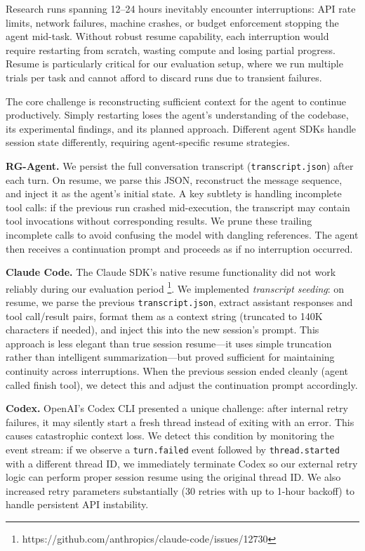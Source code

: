 \documentclass[11pt]{article}
\let\oldtexttt\texttt
\renewcommand{\texttt}[1]{{\fontseries{m}\selectfont\oldtexttt{#1}}}
\theoremstyle{plain}
\theoremstyle{definition}
\theoremstyle{remark}
\begin{document}
Research runs spanning 12--24 hours inevitably encounter interruptions: API rate limits, network failures, machine crashes, or budget enforcement stopping the agent mid-task. Without robust resume capability, each interruption would require restarting from scratch, wasting compute and losing partial progress. Resume is particularly critical for our evaluation setup, where we run multiple trials per task and cannot afford to discard runs due to transient failures.

The core challenge is reconstructing sufficient context for the agent to continue productively. Simply restarting loses the agent's understanding of the codebase, its experimental findings, and its planned approach. Different agent SDKs handle session state differently, requiring agent-specific resume strategies.

\textbf{RG-Agent.} We persist the full conversation transcript (\texttt{transcript.json}) after each turn. On resume, we parse this JSON, reconstruct the message sequence, and inject it as the agent's initial state. A key subtlety is handling incomplete tool calls: if the previous run crashed mid-execution, the transcript may contain tool invocations without corresponding results. We prune these trailing incomplete calls to avoid confusing the model with dangling references. The agent then receives a continuation prompt and proceeds as if no interruption occurred.

\textbf{Claude Code.} The Claude SDK's native resume functionality did not work reliably during our evaluation period \footnote{https://github.com/anthropics/claude-code/issues/12730}. We implemented \emph{transcript seeding}: on resume, we parse the previous \texttt{transcript.json}, extract assistant responses and tool call/result pairs, format them as a context string (truncated to 140K characters if needed), and inject this into the new session's prompt. This approach is less elegant than true session resume---it uses simple truncation rather than intelligent summarization---but proved sufficient for maintaining continuity across interruptions. When the previous session ended cleanly (agent called finish tool), we detect this and adjust the continuation prompt accordingly.

\textbf{Codex.} OpenAI's Codex CLI presented a unique challenge: after internal retry failures, it may silently start a fresh thread instead of exiting with an error. This causes catastrophic context loss. We detect this condition by monitoring the event stream: if we observe a \texttt{turn.failed} event followed by \texttt{thread.started} with a different thread ID, we immediately terminate Codex so our external retry logic can perform proper session resume using the original thread ID. We also increased retry parameters substantially (30 retries with up to 1-hour backoff) to handle persistent API instability.
\end{document}
